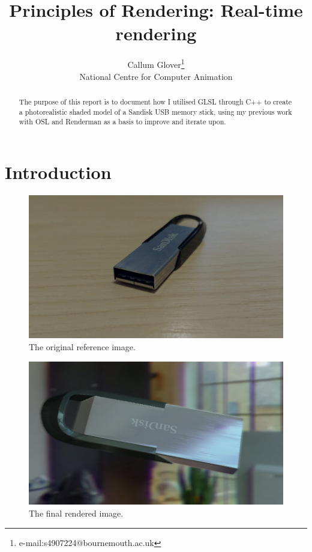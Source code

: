 \documentclass[]{acmsiggraph}
\title{Principles of Rendering: Real-time rendering}
\author{Callum Glover\thanks{e-mail:s4907224@bournemouth.ac.uk}\\National Centre for Computer Animation}
\begin{document}
\maketitle

\begin{abstract}
The purpose of this report is to document how I utilised GLSL through C++ to create a photorealistic shaded model of a Sandisk USB memory stick, using my previous work with OSL and Renderman as a 
basis to improve and iterate upon.  
\end{abstract}

\section{Introduction} \label{sec:Introduction}
\begin{figure}[htbp]\centering
 \includegraphics[width=0.75\linewidth]{images/pref.jpg}
 \caption{\label{fig:reference}The original reference image.}
\end{figure}

\begin{figure}[htbp]\centering
 \includegraphics[width=0.75\linewidth]{images/tempRef.png}
 \caption{\label{fig:final}The final rendered image.}
\end{figure}
\end{document}
